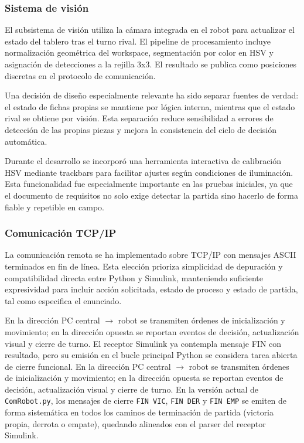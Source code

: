 \documentclass[12pt,a4paper]{article}
\begin{document}
\subsubsection{Sistema de visi\'on}
El subsistema de visi\'on utiliza la c\'amara integrada en el robot para actualizar el estado del tablero tras el turno rival. El pipeline de procesamiento incluye normalizaci\'on geom\'etrica del workspace, segmentaci\'on por color en HSV y asignaci\'on de detecciones a la rejilla 3x3. El resultado se publica como posiciones discretas en el protocolo de comunicaci\'on.
\par
Una decisi\'on de dise\~no especialmente relevante ha sido separar fuentes de verdad: el estado de fichas propias se mantiene por l\'ogica interna, mientras que el estado rival se obtiene por visi\'on. Esta separaci\'on reduce sensibilidad a errores de detecci\'on de las propias piezas y mejora la consistencia del ciclo de decisi\'on autom\'atica.

Durante el desarrollo se incorpor\'o una herramienta interactiva de calibraci\'on HSV mediante trackbars para facilitar ajustes seg\'un condiciones de iluminaci\'on. Esta funcionalidad fue especialmente importante en las pruebas iniciales, ya que el documento de requisitos no solo exige detectar la partida sino hacerlo de forma fiable y repetible en campo.

\subsubsection{Comunicaci\'on TCP/IP}
La comunicaci\'on remota se ha implementado sobre TCP/IP con mensajes ASCII terminados en fin de l\'inea. Esta elecci\'on prioriza simplicidad de depuraci\'on y compatibilidad directa entre Python y Simulink, manteniendo suficiente expresividad para incluir acci\'on solicitada, estado de proceso y estado de partida, tal como especifica el enunciado.
\par
En la direcci\'on PC central $\rightarrow$ robot se transmiten \'ordenes de inicializaci\'on y movimiento; en la direcci\'on opuesta se reportan eventos de decisi\'on, actualizaci\'on visual y cierre de turno. El receptor Simulink ya contempla mensaje FIN con resultado, pero su emisi\'on en el bucle principal Python se considera tarea abierta de cierre funcional.
En la direcci\'on PC central $\rightarrow$ robot se transmiten \'ordenes de inicializaci\'on y movimiento; en la direcci\'on opuesta se reportan eventos de decisi\'on, actualizaci\'on visual y cierre de turno. En la versi\'on actual de \texttt{ComRobot.py}, los mensajes de cierre \texttt{FIN VIC}, \texttt{FIN DER} y \texttt{FIN EMP} se emiten de forma sistem\'atica en todos los caminos de terminaci\'on de partida (victoria propia, derrota o empate), quedando alineados con el parser del receptor Simulink.
\end{document}
